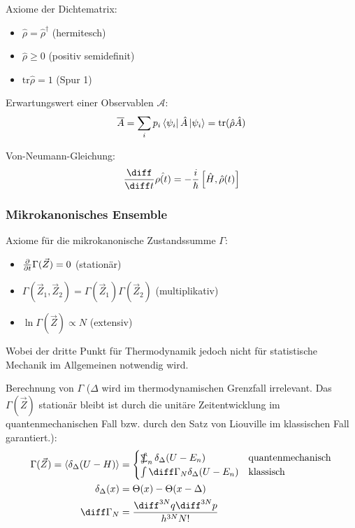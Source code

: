 \documentclass[11pt]{article}
\DeclareMathOperator*{\SumInt}{%
\mathchoice%
  {\ooalign{$\displaystyle\sum$\cr\hidewidth$\displaystyle\int$\hidewidth\cr}}
  {\ooalign{\raisebox{.14\height}{\scalebox{.7}{$\textstyle\sum$}}\cr\hidewidth$\textstyle\int$\hidewidth\cr}}
  {\ooalign{\raisebox{.2\height}{\scalebox{.6}{$\scriptstyle\sum$}}\cr$\scriptstyle\int$\cr}}
  {\ooalign{\raisebox{.2\height}{\scalebox{.6}{$\scriptstyle\sum$}}\cr$\scriptstyle\int$\cr}}
}
\numberwithin{equation}{section}
\begin{document}
        Axiome der Dichtematrix:
        \begin{itemize}\itemsep -0pt  %
          \item $\hat{\rho} = \hat{\rho}^\dagger$ \hfill{(hermitesch)}
          \item $\hat{\rho} \ge 0 $ \hfill{(positiv semidefinit)}
          \item $\mathrm{tr} \hat{\rho} = 1$ \hfill{(Spur 1)}
        \end{itemize}

        Erwartungswert einer Observablen $\mathcal{A}$:
        \begin{equation}
          \overline{A} = \sum_i p_i \Bra{\psi_i}\hat{A}\Ket{\psi_i} = \mathrm{tr} (\hat{\rho}\hat{A})
        \end{equation}

        Von-Neumann-Gleichung:
        \begin{equation}
          \tder{}{t}\hat{\rho(t)} = -\frac{i}{\hbar} \com{\hat{H}}{\hat{\rho}(t)}
        \end{equation}

      \subsubsection{Mikrokanonisches Ensemble}
        Axiome für die mikrokanonische Zustandssumme $\Gamma$:
        \begin{itemize}\itemsep -0pt  %
          \item $\frac{\partial }{\partial t}\Gamma(\vec{Z}) = 0$ \hfill{(stationär)}
          \item $\Gamma(\vec{Z}_1,\vec{Z}_2) = \Gamma(\vec{Z}_1)\Gamma(\vec{Z}_2) $ \hfill{(multiplikativ)}
          \item $\ln\Gamma(\vec{Z}) \propto N$ \hfill{(extensiv)}
        \end{itemize}
        Wobei der dritte Punkt für Thermodynamik jedoch nicht für statistische Mechanik im Allgemeinen notwendig wird.

        Berechnung von $\Gamma$ ($\Delta$ wird im thermodynamischen Grenzfall irrelevant. Das $\Gamma(\vec{Z})$ stationär bleibt ist durch die unitäre Zeitentwicklung im quantenmechanischen Fall bzw. durch den Satz von Liouville im klassischen Fall garantiert.):
        \begin{equation}
          \begin{aligned}
            \Gamma(\vec{Z}) = \langle \delta_\Delta (U-H) \rangle
              &= \begin{cases}
                  \SumInt_n \delta_\Delta(U-E_n) & \text{quantenmechanisch} \\
                  \int \diff \Gamma_N \delta_\Delta(U-E_n) & \text{klassisch}
                \end{cases} \\
            \delta_\Delta(x) &= \Theta(x) - \Theta(x-\Delta)\\
            \diff \Gamma_N &= \frac{\diff^{3N}q \diff^{3N}p }{h^{3N} N!}
          \end{aligned}
        \end{equation}
\end{document}
